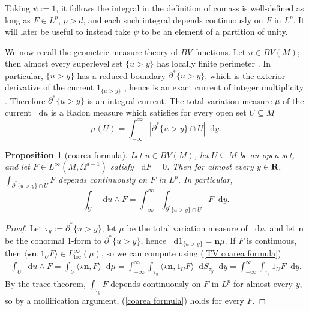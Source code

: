 \documentclass[reqno,11pt]{amsart}
\newcommand{\RR}{\mathbf{R}}
\newcommand*\dif{\mathop{}\!\mathrm{d}}
\newcommand{\normal}{\mathbf n}
\newcommand{\loc}{\mathrm{loc}}
\newtheorem{proposition}[theorem]{Proposition}
\theoremstyle{definition}
\numberwithin{equation}{section}
\begin{document}
Taking $\psi := 1$, it follows the integral in the definition of comass is well-defined as long as $F \in L^p$, $p > d$, and each such integral depends continuously on $F$ in $L^p$.
It will later be useful to instead take $\psi$ to be an element of a partition of unity.

We now recall the geometric measure theory of $BV$ functions.
Let $u \in BV(M)$; then almost every superlevel set $\{u > y\}$ has locally finite perimeter \cite[Theorem 1.23]{Giusti77}.
In particular, $\{u > y\}$ has a reduced boundary $\partial^* \{u > y\}$, which is the exterior derivative of the current $1_{\{u > y\}}$ \cite[Chapter 3]{Giusti77}, hence is an exact current of integer multiplicity \cite[Theorem 14.3]{Simon84}.
Therefore $\partial^* \{u > y\}$ is an integral current.
The total variation measure $\mu$ of the current $\dif u$ is a Radon measure which satisfies for every open set $U \subseteq M$ \cite[Proposition 2.5]{BackusFLG}
\begin{equation}\label{TV coarea formula}
\mu(U) = \int_{-\infty}^\infty |\partial^* \{u > y\} \cap U| \dif y.
\end{equation}

\begin{proposition}[coarea formula]
Let $u \in BV(M)$, let $U \subseteq M$ be an open set, and let $F \in L^\infty(M, \Omega^{d - 1})$ satisfy $\dif F = 0$.
Then for almost every $y \in \RR$, $\int_{\partial^* \{u > y\} \cap U} F$ depends continuously on $F$ in $L^p$.
In particular,
\begin{equation}\label{coarea formula}
\int_U \dif u \wedge F = \int_{-\infty}^\infty \int_{\partial^* \{u > y\} \cap U} F \dif y.
\end{equation}
\end{proposition}
\begin{proof}
Let $\tau_y := \partial^* \{u > y\}$, let $\mu$ be the total variation measure of $\dif u$, and let $\normal$ be the conormal $1$-form to $\partial^* \{u > y\}$, hence $\dif 1_{\{u > y\}} = \normal \mu$.
If $F$ is continuous, then $\langle\star \normal, 1_U F\rangle \in L^\infty_\loc(\mu)$, so we can compute using (\ref{TV coarea formula})
\begin{align*}
\int_U \dif u \wedge F = \int_U \langle \star \normal, F\rangle \dif \mu = \int_{-\infty}^\infty \int_{\tau_y} \langle \star \normal, 1_U F\rangle \dif S_{\tau_y} \dif y = \int_{-\infty}^\infty \int_{\tau_y} 1_U F \dif y.
\end{align*}
By the trace theorem, $\int_{\tau_y} F$ depends continuously on $F$ in $L^p$ for almost every $y$, so by a mollification argument, (\ref{coarea formula}) holds for every $F$.
\end{proof}
\end{document}
